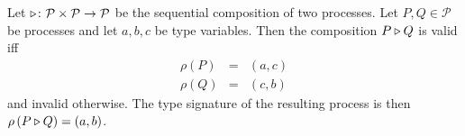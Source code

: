 \begin{definition}
\label{def:static_sequence}
Let $\triangleright \colon \mathcal{P} \times \mathcal{P} \to \mathcal{P}$ be the sequential composition of two processes. Let $P, Q \in \mathcal{P}$ be processes and let $a, b, c$ be type variables. Then the composition $P \triangleright Q$ is valid iff
\begin{eqnarray*}
  \rho \left( P \right) & = & \left( a, c \right) \\
  \rho \left( Q \right) & = & \left( c, b \right)
\end{eqnarray*}
and invalid otherwise. The type signature of the resulting process is then $\rho \left( P \triangleright Q \right) = \left( a, b \right)$.

\hfill\qedsymbol
\end{definition}







